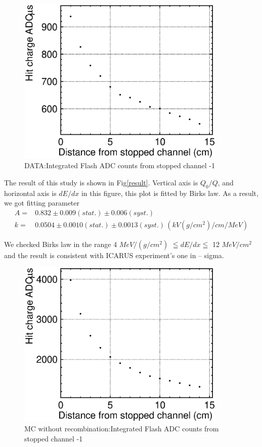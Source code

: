 \begin{figure}[!htb]
  \centering
  \centering
  \includegraphics[width=10cm,clip]{./fig/Q.eps}
  \caption{DATA:Integrated Flash ADC counts from stopped channel -1}
  \label{fadcDist1}
\end{figure}
\pagebreak
\pagebreak

The result of this study is shown in Fig\ref{result}. Vertical axis is $Q_{0}/Q$, and horizontal axis is $dE/dx$ in this figure, this plot is fitted by Birks law.
As a result, we got fitting parameter\\
\begin{eqnarray}
 \nonumber  A =& 0.832\pm0.009(stat.)\pm0.006(syst.)\\
   k =& 0.0504\pm0.0010 (stat.)\pm0.0013(syst.)\,(kV(g/cm^{2})/cm/MeV)
\end{eqnarray}

We checked Birks law in the range 4 $MeV/(g/cm^2)$ $\leqq dE/dx \leqq$ 12 $MeV/cm^2$ and the result is consistent with ICARUS experiment's one\cite{658352} in -- sigma.

\begin{figure}[!htb]
  \centering
  \centering
  \includegraphics[width=10cm,clip]{./fig/Q_0.eps}
  \caption{MC without recombination:Integrated Flash ADC counts from stopped channel -1}
  \label{fadcDistMC}
\end{figure}

